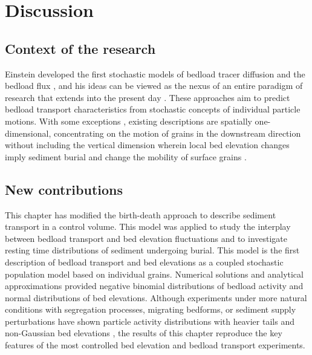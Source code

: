 \section{Discussion}
\label{sec:elediscussion}

\subsection{Context of the research}
Einstein developed the first stochastic models of bedload tracer diffusion \citep{Einstein1937} and the bedload flux \citep{Einstein1950}, and his ideas can be viewed as the nexus of an entire paradigm of research that extends into the present day \citep[e.g.][]{Hubbell1964, Nakagawa1976,Hassan1991,Ancey2008, Wu2019}.
These approaches aim to predict bedload transport characteristics from stochastic concepts of individual particle motions.
With some exceptions \citep{Yang1971,Nakagawa1980,Pelosi2016,Wu2019,Wu2019a}, existing descriptions are spatially one-dimensional, concentrating on the motion of grains in the downstream direction without including the vertical dimension wherein local bed elevation changes imply sediment burial \citep{Voepel2013,Martin2014} and change the mobility of surface grains \citep{Yang1971,Nakagawa1980}.

\subsection{New contributions}

This chapter has modified the birth-death approach to describe sediment transport in a control volume. This model was applied to study the interplay between bedload transport and bed elevation fluctuations and to investigate resting time distributions of sediment undergoing burial.
This model is the first description of bedload transport and bed elevations as a coupled stochastic population model based on individual grains.
Numerical solutions and analytical approximations provided negative binomial distributions of bedload activity and normal distributions of bed elevations.
Although experiments under more natural conditions with segregation processes,  migrating bedforms, or sediment supply perturbations have shown particle activity distributions with heavier tails \citep{Dhont2018,Saletti2015} and non-Gaussian bed elevations \citep{Singh2012,Aberle2006}, the results of this chapter reproduce the key features of the most controlled bed elevation \citep{Wong2007,Martin2014} and bedload transport \citep{Heyman2016,Ancey2008} experiments.

